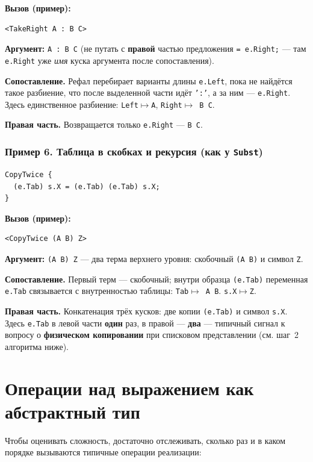 \documentclass[12pt,a4paper]{article}
\begin{document}
\noindent\textbf{Вызов (пример):}
\begin{lstlisting}
<TakeRight A : B C>
\end{lstlisting}
\textbf{Аргумент:} \texttt{A : B C} (не путать с \textbf{правой} частью предложения \texttt{= e.Right;} --- там \texttt{e.Right} уже \emph{имя} куска аргумента после сопоставления).

\textbf{Сопоставление.} Рефал перебирает варианты длины \texttt{e.Left}, пока не найдётся такое разбиение, что после выделенной части идёт \texttt{':'}, а за ним --- \texttt{e.Right}. Здесь единственное разбиение: \texttt{Left$\mapsto$A}, \texttt{Right$\mapsto$ B C}.

\textbf{Правая часть.} Возвращается только \texttt{e.Right} --- \texttt{B C}.

\subsubsection*{Пример 6. Таблица в скобках и рекурсия (как у \texttt{Subst})}

\begin{lstlisting}
CopyTwice {
  (e.Tab) s.X = (e.Tab) (e.Tab) s.X;
}
\end{lstlisting}

\noindent\textbf{Вызов (пример):}
\begin{lstlisting}
<CopyTwice (A B) Z>
\end{lstlisting}
\textbf{Аргумент:} \texttt{(A B) Z} --- два терма верхнего уровня: скобочный \texttt{(A B)} и символ \texttt{Z}.

\textbf{Сопоставление.} Первый терм --- скобочный; внутри образца \texttt{(e.Tab)} переменная \texttt{e.Tab} связывается с внутренностью таблицы: \texttt{Tab$\mapsto$ A B}. \texttt{s.X$\mapsto$Z}.

\textbf{Правая часть.} Конкатенация трёх кусков: две копии \texttt{(e.Tab)} и символ \texttt{s.X}. Здесь \texttt{e.Tab} в левой части \textbf{один} раз, в правой --- \textbf{два} --- типичный сигнал к вопросу о \textbf{физическом копировании} при списковом представлении (см. шаг~2 алгоритма ниже).

\section{Операции над выражением как абстрактный тип}

Чтобы оценивать сложность, достаточно отслеживать, сколько раз и в каком порядке вызываются типичные операции реализации:
\end{document}
